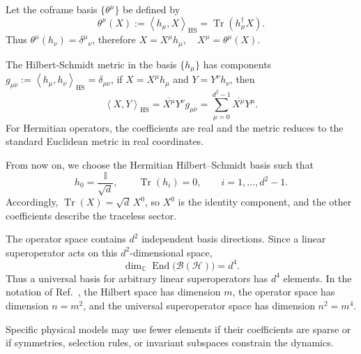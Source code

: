\documentclass[notitlepage,aip,reprint,onecolumn]{revtex4-1}
\theoremstyle{definition}
\newcommand{\HS}{\mathrm{HS}}
\renewcommand{\Tr}{\operatorname{Tr}}
\newcommand{\braketHS}[2]{\left\langle #1,#2\right\rangle_{\HS}}
\begin{document}
Let the coframe basis $\{\theta^\mu\}$ be defined by
\begin{equation} \label{eq:theta-definition}
     \theta^\mu(X):=\braketHS{h_\mu}{X}=\Tr(h_\mu^\dagger X).
\end{equation}
Thus \(\theta^\mu(h_\nu)=\delta^\mu{}_{\nu}\), therefore \( X=X^\mu h_\mu,\quad X^\mu=\theta^\mu(X)\).

The Hilbert-Schmidt metric in the basis $\{h_\mu\}$ has components \( g_{\mu\bar\nu}:=\braketHS{h_\mu}{h_\nu}=\delta_{\mu\nu}\), if $X=X^\mu h_\mu$ and $Y=Y^\nu h_\nu$, then
\begin{equation} \label{eq:HS-components}
    \braketHS{X}{Y}=\overline{X^\mu}Y^\nu g_{\mu\bar\nu}
     =\sum_{\mu=0}^{d^2-1}\overline{X^\mu}Y^\mu.
\end{equation}
For Hermitian operators, the coefficients are real and the metric reduces to the standard Euclidean metric in real coordinates.

From now on, we choose the Hermitian Hilbert--Schmidt basis such that
\[
    h_0=\frac{\mathbb I}{\sqrt d},
    \qquad
    \operatorname{Tr}(h_i)=0,
    \qquad
    i=1,\ldots,d^2-1.
\]
Accordingly, \(\operatorname{Tr}(X)=\sqrt d\,X^0\), so \(X^0\) is the identity component, and the other coefficients describe the traceless sector.

The operator space contains \(d^2\) independent basis directions. Since a linear superoperator acts on this \(d^2\)-dimensional space,
\[
    \dim_{\mathbb C}
    \operatorname{End}\!\bigl(\mathcal B(\mathcal H)\bigr)
    =
    d^4.
\]
Thus a universal basis for arbitrary linear superoperators has \(d^4\) elements. In the notation of Ref.~\cite{Bixano:2026qce}, the Hilbert space has dimension \(m\), the operator space has dimension \(n=m^2\), and the universal superoperator space has dimension \(n^2=m^4\).

Specific physical models may use fewer elements if their coefficients are sparse or if symmetries, selection rules, or invariant subspaces constrain the dynamics.

\end{document}
